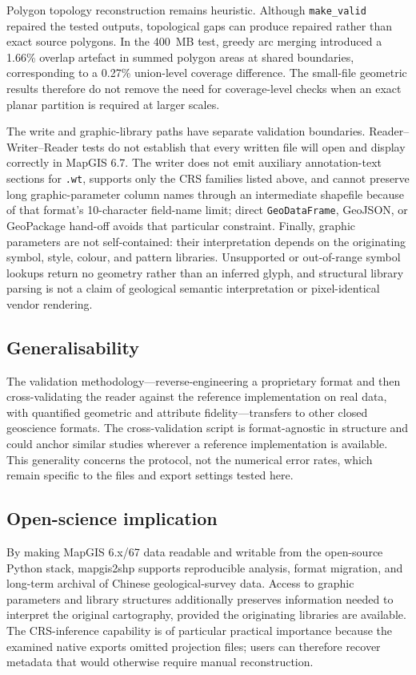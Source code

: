 \documentclass[11pt,a4paper]{article}
\begin{document}
Polygon topology reconstruction remains heuristic. Although \texttt{make\_valid} repaired the tested outputs, topological gaps can produce repaired rather than exact source polygons. In the 400~MB test, greedy arc merging introduced a 1.66\% overlap artefact in summed polygon areas at shared boundaries, corresponding to a 0.27\% union-level coverage difference. The small-file geometric results therefore do not remove the need for coverage-level checks when an exact planar partition is required at larger scales.

The write and graphic-library paths have separate validation boundaries. Reader--Writer--Reader tests do not establish that every written file will open and display correctly in MapGIS 6.7. The writer does not emit auxiliary annotation-text sections for \texttt{.wt}, supports only the CRS families listed above, and cannot preserve long graphic-parameter column names through an intermediate shapefile because of that format's 10-character field-name limit; direct \texttt{GeoDataFrame}, GeoJSON, or GeoPackage hand-off avoids that particular constraint. Finally, graphic parameters are not self-contained: their interpretation depends on the originating symbol, style, colour, and pattern libraries. Unsupported or out-of-range symbol lookups return no geometry rather than an inferred glyph, and structural library parsing is not a claim of geological semantic interpretation or pixel-identical vendor rendering.

\subsection{Generalisability}
The validation methodology---reverse-engineering a proprietary format and then cross-validating the reader against the reference implementation on real data, with quantified geometric and attribute fidelity---transfers to other closed geoscience formats. The cross-validation script is format-agnostic in structure and could anchor similar studies wherever a reference implementation is available. This generality concerns the protocol, not the numerical error rates, which remain specific to the files and export settings tested here.

\subsection{Open-science implication}
By making MapGIS 6.x/67 data readable and writable from the open-source Python stack, mapgis2shp supports reproducible analysis, format migration, and long-term archival of Chinese geological-survey data. Access to graphic parameters and library structures additionally preserves information needed to interpret the original cartography, provided the originating libraries are available. The CRS-inference capability is of particular practical importance because the examined native exports omitted projection files; users can therefore recover metadata that would otherwise require manual reconstruction.
\end{document}

